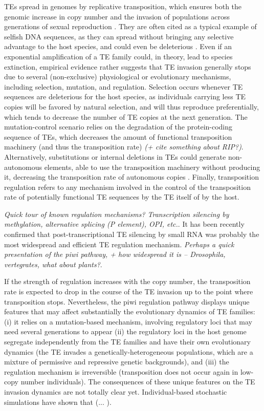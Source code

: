 \documentclass[10pt,a4paper]{article}
\begin{document}
TEs spread in genomes by replicative transposition, which ensures both the genomic increase in copy number and the invasion of populations across generations of sexual reproduction \cite{CC83}. They are often cited as a typical example of selfish DNA sequences, as they can spread without bringing any selective advantage to the host species, and could even be deleterious \cite{OC80, DS80}. Even if an exponential amplification of a TE family could, in theory, lead to species extinction, empirical evidence rather suggests that TE invasion generally stops due to several (non-exclusive) physiological or evolutionary mechanisms, including selection, mutation, and regulation. Selection occurs whenever TE sequences are deleterious for the host species, as individuals carrying less TE copies will be favored by natural selection, and will thus reproduce preferentially, which tends to decrease the number of TE copies at the next generation. The mutation-control scenario relies on the degradation of the protein-coding sequence of TEs, which decreases the amount of functional transposition machinery (and thus the transposition rate) \cite{LCB07} \emph{(+ cite something about RIP?)}. Alternatively, substitutions or internal deletions in TEs could generate non-autonomous elements, able to use the transposition machinery without producing it, decreasing the transposition rate of autonomous copies \cite{LC06, RLZ+16}. Finally, transposition regulation refers to any mechanism involved in the control of the transposition rate of potentially functional TE sequences by the TE itself of by the host. 

\emph{Quick tour of known regulation mechanisms? Transcription silencing by methylation, alternative splicing (P element), OPI, etc.}. It has been recently confirmed that post-transcriptional TE silencing by small RNA was probably the most widespread and efficient TE regulation mechanism. \emph{Perhaps a quick presentation of the piwi pathway, + how widespread it is -- Drosophila, vertegrates, what about plants?}. 

If the strength of regulation increases with the copy number, the transposition rate is expected to drop in the course of the TE invasion up to the point where transposition stops. Nevertheless, the piwi regulation pathway displays unique features that may affect substantially the evolutionary dynamics of TE families: (i) it relies on a mutation-based mechanism, involving regulatory loci that may need several generations to appear (ii) the regulatory loci in the host genome segregate independently from the TE families and have their own evolutionary dynamics (the TE invades a genetically-heterogeneous populations, which are a mixture of permissive and repressive genetic backgrounds), and (iii) the regulation mechanism is irreversible (transposition does not occur again in low-copy number individuals). The consequences of these unique features on the TE invasion dynamics are not totally clear yet. Individual-based stochastic simulations have shown that (...  \cite{Kof19,KAZ18,CL10}). 
\end{document}
